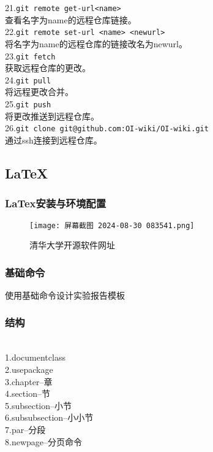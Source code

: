 \documentclass[a4paper,12pt]{article}
\begin{document}
21.\texttt{git remote get-url<name>}\\
  查看名字为name的远程仓库链接。\\

22.\texttt{git remote set-url <name> <newurl>}\\
  将名字为name的远程仓库的链接改名为newurl。\\

23.\texttt{git fetch}\\
  获取远程仓库的更改。\\

24.\texttt{git pull}\\
  将远程更改合并。\\

25.\texttt{git push}\\
  将更改推送到远程仓库。\\

26.\texttt{git clone git@github.com:OI-wiki/OI-wiki.git}\\
  通过ssh连接到远程仓库。\\

\subsection{LaTeX}
\subsubsection{LaTex安装与环境配置}
\begin{figure}[H]
    \centering
    \texttt{[image: 屏幕截图 2024-08-30 083541.png]}
    \caption{清华大学开源软件网址}
    \label{fig:enter-label}
\end{figure}
\subsubsection{\color{green}基础命令}
使用基础命令设计实验报告模板
\subsubsection{\color{yellow}结构}
\\1.documentclass\\
2.usepackage\\
3.chapter--章\\
4.section--节\\
5.subsection--小节\\
6.subsubsection--小小节\\
7.par--分段\\
8.newpage--分页命令\\
\end{document}
